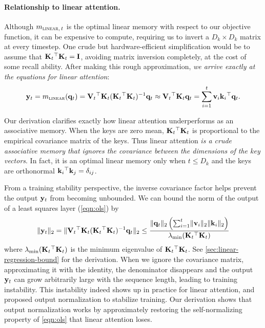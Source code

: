 \documentclass[notitlepage, 11pt]{article}
\newcommand*{\memory}{{m}}
\newcommand*{\dkey}{{D_k}}
\begin{document}
\paragraph{Relationship to linear attention.}
Although $\memory_{\textsc{linear},\,t}$ is the optimal linear memory with respect to our objective function, it can be expensive to compute, requiring us to invert a $\dkey\times\dkey$ matrix at every timestep.
One crude but hardware-efficient simplification would be to assume that $\mathbf{K}_t{}^\top\mathbf{K}_t = \mathbf{I}$, avoiding matrix inversion completely, at the cost of some recall ability.
After making this rough approximation, \emph{we arrive exactly at the equations for linear attention}:
\begin{align}
\ybf_t = \memory_{\textsc{linear}}(\qbf_t)  = \Vbf_t\transpose \Kbf_t(\Kbf_t\transpose\Kbf_t)\inverse \qbf_t \approx \Vbf_t\transpose\Kbf_t\qbf_t =\sum_{i=1}^t \vbf_i\kbf_i\transpose \qbf_t.
\end{align}

Our derivation clarifies exactly how linear attention underperforms as an associative memory.
When the keys are zero mean, $\mathbf{K}_t{}^\top\mathbf{K}_t$ is proportional to the empirical covariance matrix of the keys.
Thus linear attention \emph{is a crude associative memory that ignores the covariance between the dimensions of the key vectors}.
In fact, it is an optimal linear memory only when $t \leq \dkey$ and the keys are orthonormal $\mathbf{k}_i{}^\top\mathbf{k}_j = \delta_{ij}$.

From a training stability perspective, the inverse covariance factor helps prevent the output $\mathbf{y}_t$ from becoming unbounded.
We can bound the norm of the output of a least squares layer (\autoref{eqn:ols}) by
\begin{align}
   \lVert\mathbf{y}_t\rVert_2 = \lVert\mathbf{V}_t{}^\top\mathbf{K}_t(\mathbf{K}_t{}^\top\mathbf{K}_t)^{-1} \mathbf{q}_t\rVert_2 \leq \frac{\lVert\mathbf{q}_t\rVert_2\left(\sum_{i=1}^t\lVert \mathbf{v}_i\rVert_2\lVert\mathbf{k}_i\rVert_2\right)}{\lambda_{\text{min}}(\mathbf{K}_t{}^\top\mathbf{K}_t)}
\end{align}
where $\lambda_{\text{min}}(\mathbf{K}_t{}^\top\mathbf{K}_t)$ is the minimum eigenvalue of $\mathbf{K}_t{}^\top\mathbf{K}_t$.
See \autoref{sec:linear-regression-bound} for the derivation.
When we ignore the covariance matrix, approximating it with the identity, the denominator disappears and the output $\mathbf{y}_t$ can grow arbitrarily large with the sequence length, leading to training instability.
This instability indeed shows up in practice for linear attention, and \citet{Qin2022DevilLinearTransformer} proposed output normalization to stabilize training.
Our derivation shows that output normalization works by approximately restoring the self-normalizing property of \autoref{eqn:ols} that linear attention loses.
\end{document}
